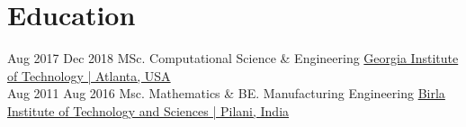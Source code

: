 \documentclass[letterpaper]{DS_class_file} %
\begin{document}
\section{Education}

\begin{twenty} %

   	\twentyitem
	    {Aug 2017}
	    {Dec 2018}
	    {\hspace{0.2cm}MSc. Computational Science \& Engineering}
	    {\href{https://www.gatech.edu/}{\textbf{} }}
	    {\hspace{0.2cm}\href{https://www.gatech.edu/}{Georgia Institute of Technology | Atlanta, USA} }
        \\
    \twentyitem
	    {Aug 2011}
	    {Aug 2016}
	    {\hspace{0.2cm}Msc. Mathematics \& BE. Manufacturing Engineering}
	    {\href{https://www.gatech.edu/}{\textbf{} }}
	    {\hspace{0.2cm}\href{https://www.bits-pilani.ac.in/}{Birla Institute of Technology and Sciences | Pilani, India} }
        \\
\end{twenty}


\end{document}
